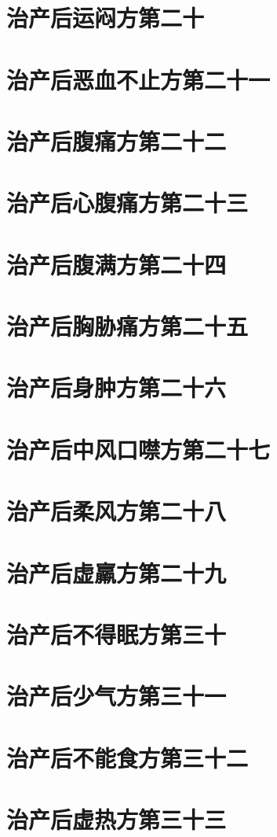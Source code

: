 \documentclass[a4paper,12pt,UTF8,twoside]{ctexbook}
\begin{document}
\chapter{治产后运闷方第二十}
\chapter{治产后恶血不止方第二十一}
\chapter{治产后腹痛方第二十二}
\chapter{治产后心腹痛方第二十三}
\chapter{治产后腹满方第二十四}
\chapter{治产后胸胁痛方第二十五}
\chapter{治产后身肿方第二十六}
\chapter{治产后中风口噤方第二十七}
\chapter{治产后柔风方第二十八}
\chapter{治产后虚羸方第二十九}
\chapter{治产后不得眠方第三十}
\chapter{治产后少气方第三十一}
\chapter{治产后不能食方第三十二}
\chapter{治产后虚热方第三十三}
\end{document}
